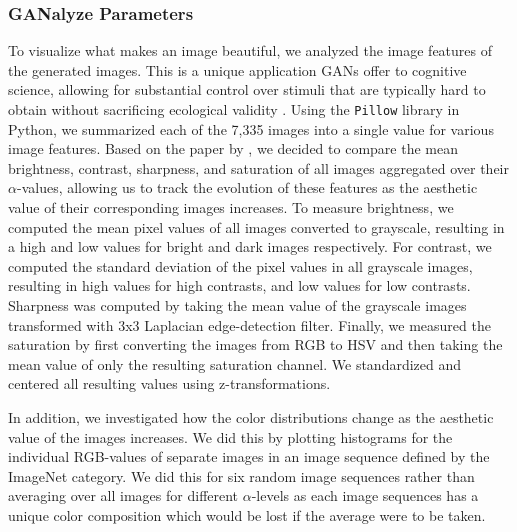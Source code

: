 \documentclass[../main.tex]{subfiles}
\begin{document}
	\subsubsection{GANalyze Parameters}
	To visualize what makes an image beautiful, we analyzed the image features of the generated images. This is a unique application GANs offer to cognitive science, allowing for substantial control over stimuli that are typically hard to obtain without sacrificing ecological validity \parencite{goetschalckx2021generative}. Using the \texttt{Pillow} library \parencite{clark2015pillow} in Python, we summarized each of the 7,335 images into a single value for various image features. Based on the paper by \textcite{ke2006design}, we decided to compare the mean brightness, contrast, sharpness, and saturation of all images aggregated over their $\alpha$-values, allowing us to track the evolution of these features as the aesthetic value of their corresponding images increases. To measure brightness, we computed the mean pixel values of all images converted to grayscale, resulting in a high and low values for bright and dark images respectively. For contrast, we computed the standard deviation of the pixel values in all grayscale images, resulting in high values for high contrasts, and low values for low contrasts. Sharpness was computed by taking the mean value of the grayscale images transformed with 3x3 Laplacian edge-detection filter. Finally, we measured the saturation by first converting the images from RGB to HSV and then taking the mean value of only the resulting saturation channel. We standardized and centered all resulting values using z-transformations.
		
	In addition, we investigated how the color distributions change as the aesthetic value of the images increases. We did this by plotting histograms for the individual RGB-values of separate images in an image sequence defined by the ImageNet category. We did this for six random image sequences rather than averaging over all images for different $\alpha$-levels as each image sequences has a unique color composition which would be lost if the average were to be taken.
\end{document}
